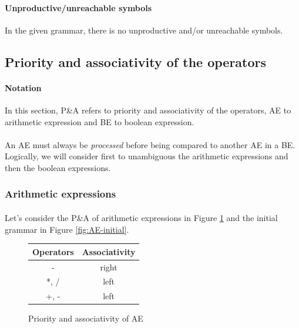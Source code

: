 \documentclass[letterpaper]{article}
\begin{document}
\paragraph{Unproductive/unreachable symbols}

In the given grammar, there is no unproductive and/or unreachable symbols.

\subsection{Priority and associativity of the operators}

\paragraph{Notation} In this section, P\&A refers to priority and associativity
of the operators, AE to arithmetic expression and BE to boolean expression.

\paragraph{}

An AE must always be \textit{processed}
before being compared
to another AE in a BE. Logically, we will consider first to unambiguous
the arithmetic expressions and then the boolean expressions.

\subsubsection{Arithmetic expressions}

\paragraph{}

Let's consider the P\&A of arithmetic expressions in Figure \ref{fig:AE-pa}
and the initial grammar in Figure \ref{fig:AE-initial}.

\begin{figure}[H]
    \centering
    \begin{tabular}{|c|c|}
        \hline
        Operators & Associativity \\
        \hline
        \hline
        - & right \\
        \hline
        *, / & left \\
        \hline
        +, - & left \\
        \hline
    \end{tabular}
    \caption{Priority and associativity of AE}
    \label{fig:AE-pa}
\end{figure}
\end{document}
